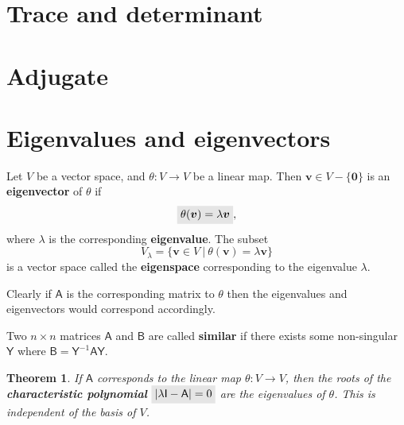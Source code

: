 \documentclass[letter-paper]{tufte-book}
\newtheorem{theorem}{\color{pastel-blue}Theorem}[section]
\newcommand{\As}{{\mathsf{A}}}
\newcommand{\Bs}{{\mathsf{B}}}
\newcommand{\Is}{{\mathsf{I}}}
\newcommand{\Ys}{{\mathsf{Y}}}
\newcommand{\Ob}{{\boldsymbol{0}}}
\newcommand{\vb}{{\boldsymbol{v}}}
\newcommand{\highlight}[1]{\mathchoice%
  {\colorbox{black!10}{$\displaystyle#1$}}%
  {\colorbox{black!10}{$\textstyle#1$}}%
  {\colorbox{black!10}{$\scriptstyle#1$}}%
  {\colorbox{black!10}{$\scriptscriptstyle#1$}}}%
\begin{document}
\section{Trace and determinant}


\section{Adjugate}


\section{Eigenvalues and eigenvectors}

Let $V$ be a vector space, and $\theta:V \to V$ be a linear map. Then $\vb\in
V-\{\Ob\}$ is an \textbf{eigenvector} of $\theta$ if
\begin{equation}
  \highlight{\theta(\vb) = \lambda \vb},
\end{equation}
where $\lambda$ is the corresponding \textbf{eigenvalue}. The subset
\begin{equation}
  V_{\lambda} = \{\vb\in V \ |\ \theta(\vb) = \lambda \vb\}
\end{equation}
is a vector space called the \textbf{eigenspace} corresponding to the eigenvalue
$\lambda$.

Clearly if $\As$ is the corresponding matrix to $\theta$ then the eigenvalues
and eigenvectors would correspond accordingly.

Two $n\times n$ matrices $\As$ and $\Bs$ are called \textbf{similar} if there
exists some non-singular $\Ys$ where $\Bs = \Ys^{-1} \As \Ys$.

\begin{theorem}
  If $\As$ corresponds to the linear map $\theta:V\to V$, then the roots of the
  \textbf{characteristic polynomial} $\highlight{|\lambda\Is - \As| = 0}$ are
  the eigenvalues of $\theta$. This is independent of the basis of $V$.
\end{theorem}
\end{document}
